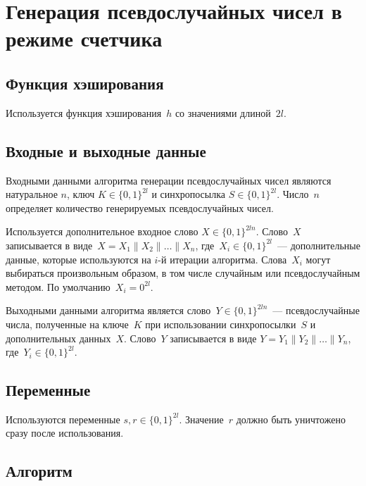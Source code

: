 \section{Генерация псевдослучайных чисел в режиме счетчика}\label{PRNG-CTR}

\subsection{Функция хэширования}

Используется функция хэширования~$h$ со значениями длиной~$2l$.

\subsection{Входные и выходные данные}

Входными данными алгоритма генерации псевдослучайных чисел являются 
натуральное $n$, ключ $K\in\{0,1\}^{2l}$ 
и синхропосылка $S\in\{0,1\}^{2l}$. 
Число~$n$ определяет количество генерируемых псевдослучайных чисел.

Используется дополнительное входное слово $X\in\{0,1\}^{2ln}$.
Слово~$X$ записывается в виде~$X=X_1\parallel X_2\parallel\ldots\parallel X_n$,
где~$X_i\in\{0,1\}^{2l}$~--- дополнительные данные,
которые используются на $i$-й итерации алгоритма.
Слова~$X_i$ могут выбираться произвольным образом, 
в том числе случайным или псевдослучайным методом.
По умолчанию~$X_i=0^{2l}$.

Выходными данными алгоритма является слово~$Y\in\{0,1\}^{2ln}$~---
псевдослучайные числа, полученные на ключе~$K$ при использовании
синхропосылки~$S$ и дополнительных данных~$X$. 
Слово~$Y$ записывается в виде
$Y=Y_1\parallel Y_2\parallel\ldots\parallel Y_n$, 
где~$Y_i\in\{0,1\}^{2l}$.

\subsection{Переменные}

Используются переменные $s, r\in\{0,1\}^{2l}$.
%
Значение~$r$ должно быть уничтожено сразу после использования.

\subsection{Алгоритм}

